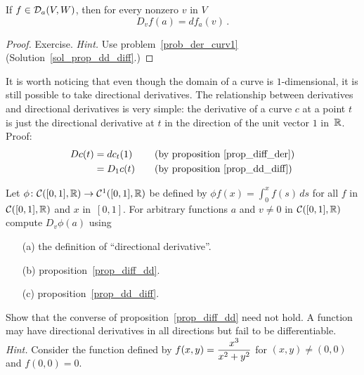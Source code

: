\begin{prop}\label{prop_dd_diff} If $f \in \mathcal{D}_a(V,W)$, then for every nonzero $v$ in $V$
  \[ D_vf(a) = df_a(v)\,. \]
\end{prop}

\begin{proof} Exercise.  \emph{Hint.} Use problem~\ref{prob_der_curv1}
(Solution~\ref{sol_prop_dd_diff}.)  \ns
\end{proof}

It is worth noticing that even though the domain of a curve is $1$-dimensional, it is still
possible to take directional derivatives.  The relationship between derivatives and
directional derivatives is very simple: the derivative of a curve $c$ at a point $t$ is just
the directional derivative at $t$ in the direction of the unit vector $1$ in~$\mathbb{R}$.  Proof:
 \begin{alignat*}{2}
    Dc(t) &= dc_t(1) & &\quad \text{(by
                           proposition~\ref{prop_diff_der})} \\
          &= D_1c(t) & &\quad \text{(by
                           proposition~\ref{prop_dd_diff})}
 \end{alignat*}

\begin{prob}  Let $\phi \colon \mathcal{C}([0,1],\mathbb{R}) \rightarrow \mathcal{C}^1([0,1],\mathbb{R})$ be defined by $\phi f(x)
= \int_0^x f(s)\,ds$ for all $f$ in $\mathcal{C}([0,1],\mathbb{R})$ and $x$ in~$[0,1]$. For arbitrary
functions $a$ and $v \ne 0$ in $\mathcal{C}([0,1],\mathbb{R})$ compute $D_v\phi(a)$ using
 \begin{enumerate}
  \item[(a)] the definition of ``directional derivative''.
  \item[(b)] proposition~\ref{prop_diff_dd}.
  \item[(c)] proposition~\ref{prop_dd_diff}.
 \end{enumerate}
\end{prob}

\begin{prob}\label{prob_dd3}  Show that the converse of proposition~\ref{prop_diff_dd} need not hold.
A function may have directional derivatives in all directions but fail to be differentiable.
\emph{Hint.}  Consider the function defined by $f(x,y) = \smash[b]{\dfrac{x^3}{x^2 + y^2}}$
for $(x,y) \ne (0,0)$ and $f(0,0) = 0$.
\end{prob}










